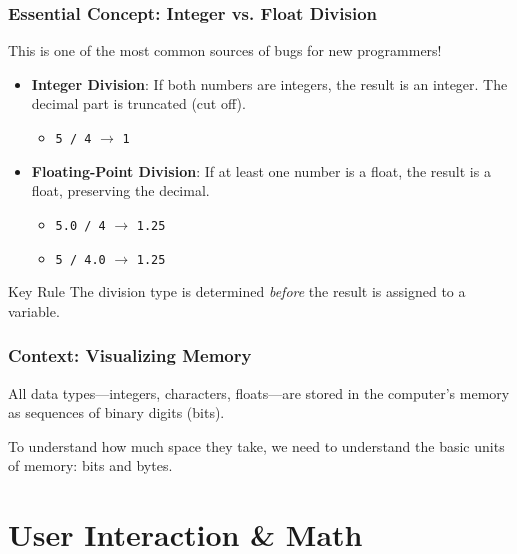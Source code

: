 \documentclass{beamer}
\begin{document}
\begin{frame}
\frametitle{Essential Concept: Integer vs. Float Division}
This is one of the most common sources of bugs for new programmers!
\pause
\begin{itemize}
    \item \textbf{Integer Division}: If \alert{both} numbers are integers, the result is an integer. The decimal part is \alert{truncated} (cut off).\pause
    \begin{itemize}
        \item \texttt{5 / 4} \hfill $\rightarrow$ \texttt{1}
    \end{itemize}
    \pause
    \item \textbf{Floating-Point Division}: If \alert{at least one} number is a float, the result is a float, preserving the decimal.\pause
    \begin{itemize}
        \item \texttt{5.0 / 4} \hfill $\rightarrow$ \texttt{1.25}\pause
        \item \texttt{5 / 4.0} \hfill $\rightarrow$ \texttt{1.25}
    \end{itemize}
\end{itemize}
\pause
\begin{alertblock}{Key Rule}
The division type is determined \textit{before} the result is assigned to a variable.
\end{alertblock}
\end{frame}


\begin{frame}
\frametitle{Context: Visualizing Memory}
All data types—integers, characters, floats—are stored in the computer's memory as sequences of binary digits (bits).\pause

To understand how much space they take, we need to understand the basic units of memory: bits and bytes.
\end{frame}


\section{User Interaction \& Math}
\end{document}
